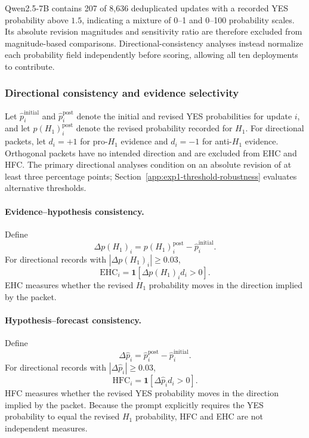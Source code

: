 Qwen2.5-7B contains 207 of 8,636 deduplicated updates with a recorded YES probability above $1.5$, indicating a mixture of 0--1 and 0--100 probability scales.
Its absolute revision magnitudes and sensitivity ratio are therefore excluded from magnitude-based comparisons.
Directional-consistency analyses instead normalize each probability field independently before scoring, allowing all ten deployments to contribute.

\subsubsection{Directional consistency and evidence selectivity}
\label{app:metric-definitions}

Let $\hat p_i^{\mathrm{initial}}$ and $\hat p_i^{\mathrm{post}}$ denote the initial and revised YES probabilities for update $i$, and let $p(H_1)_i^{\mathrm{post}}$ denote the revised probability recorded for $H_1$.
For directional packets, let $d_i=+1$ for pro-$H_1$ evidence and $d_i=-1$ for anti-$H_1$ evidence.
Orthogonal packets have no intended direction and are excluded from EHC and HFC.
The primary directional analyses condition on an absolute revision of at least three percentage points; Section~\ref{app:exp1-threshold-robustness} evaluates alternative thresholds.

\paragraph{Evidence--hypothesis consistency.}
Define
\[
\Delta p(H_1)_i=p(H_1)_i^{\mathrm{post}}-\hat p_i^{\mathrm{initial}}.
\]
For directional records with \(|\Delta p(H_1)_i|\geq0.03\),
\begin{equation}
\mathrm{EHC}_i=\mathbf{1}\!\left[\Delta p(H_1)_i d_i>0\right].
\label{eq:ehc}
\end{equation}
EHC measures whether the revised $H_1$ probability moves in the direction implied by the packet.

\paragraph{Hypothesis--forecast consistency.}
Define
\[
\Delta\hat p_i=\hat p_i^{\mathrm{post}}-\hat p_i^{\mathrm{initial}}.
\]
For directional records with \(|\Delta\hat p_i|\geq0.03\),
\begin{equation}
\mathrm{HFC}_i=\mathbf{1}\!\left[\Delta\hat p_i d_i>0\right].
\label{eq:hfc}
\end{equation}
HFC measures whether the revised YES probability moves in the direction implied by the packet.
Because the prompt explicitly requires the YES probability to equal the revised $H_1$ probability, HFC and EHC are not independent measures.

